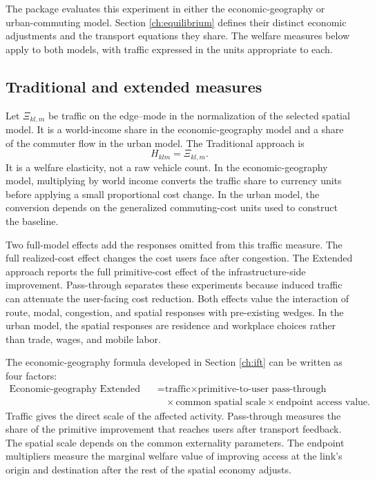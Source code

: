 The package evaluates this experiment in either the economic-geography or
urban-commuting model. Section \ref{ch:equilibrium} defines their distinct
economic adjustments and the transport equations they share. The welfare
measures below apply to both models, with traffic expressed in the units
appropriate to each.

\subsection{Traditional and extended measures}

Let \(\Xi_{kl,m}\) be traffic on the edge--mode in the normalization of the
selected spatial model. It is a world-income share in the
economic-geography model and a share of the commuter flow in the urban model.
The Traditional approach is
\[
  H_{klm}=\Xi_{kl,m}.
\]
It is a welfare elasticity, not a raw vehicle count. In the
economic-geography model, multiplying by world income converts the traffic
share to currency units before applying a small proportional cost change. In
the urban model, the conversion depends on the generalized commuting-cost
units used to construct the baseline.

Two full-model effects add the responses omitted from this traffic measure.
The full realized-cost effect
changes the cost users face after congestion. The Extended approach reports
the full primitive-cost effect of the infrastructure-side improvement.
Pass-through separates these experiments because induced traffic can attenuate
the user-facing cost reduction. Both effects value the interaction of route,
modal, congestion, and spatial responses with pre-existing wedges. In the
urban model, the spatial responses are residence and workplace choices
rather than trade, wages, and mobile labor.

The economic-geography formula developed in Section \ref{ch:ift} can be
written as four factors:
\[
\boxed{
\begin{aligned}
\text{Economic-geography Extended benefit}
={}&
\text{traffic}
\times
\text{primitive-to-user pass-through}\\
&{}\times
\text{common spatial scale}
\times
\text{endpoint access value}.
\end{aligned}}
\]
Traffic gives the direct scale of the affected activity. Pass-through measures
the share of the primitive improvement that reaches users after transport
feedback.
The spatial scale depends on the common externality parameters. The endpoint
multipliers measure the marginal welfare value of improving access at the
link's origin and destination after the rest of the spatial economy adjusts.

